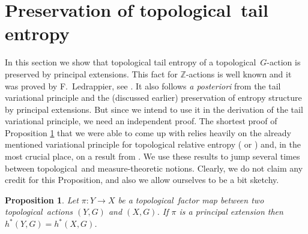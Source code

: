 \documentclass[12pt]{amsart}
\newtheorem{prop}[theorem]{Proposition}
\theoremstyle{definition}
\numberwithin{equation}{section}
\def \tl {topological}
\def \tl {topological}
\begin{document}
\section{Preservation of \tl\ tail entropy}
In this section we show that topological tail entropy of a \tl\ $G$-action is preserved by principal extensions. This fact for $\mathbb{Z}$-actions is well known and it was proved by F.\ Ledrappier, see \cite[Theorem 3]{Ledrappier}. It also follows \emph{a posteriori} from the tail variational principle and the (discussed earlier) preservation of entropy structure by principal extensions. But since we intend to use it in the derivation of the tail variational principle, we need an independent proof. The shortest proof of Proposition \ref{principal} that we were able to come up with relies heavily on the already mentioned variational principle for topological relative entropy (\cite[Theorem 13.3]{DZ} or \cite[Theorem 5.1]{Yan}) and, in the most crucial place, on a result from \cite{ZhouZhangChen}. We use these results to jump several times between \tl\ and measure-theoretic notions. Clearly, we do not claim any credit for this Proposition, and also we allow ourselves to be a bit sketchy.

\begin{prop} \label{principal}
Let $\pi:Y\to X$ be a \tl\ factor map between two \tl\ actions $(Y,G)$ and $(X,G)$. If $\pi$ is a principal extension then $h^* (Y, G)= h^* (X, G)$.
\end{prop}
\end{document}
